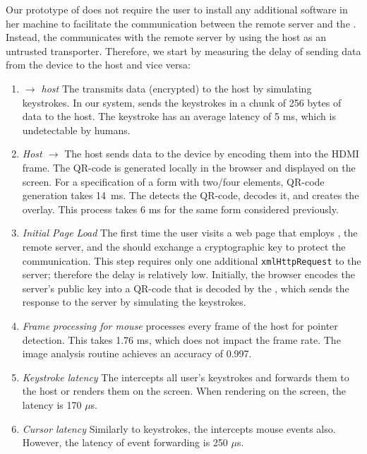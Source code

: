 Our prototype of \name does not require the user to install any additional software in her machine to facilitate the communication between the remote server and the \device. Instead, the \device communicates with the remote server by using the host as an untrusted transporter. Therefore, we start by measuring the delay of sending data from the device to the host and vice versa:

\begin{enumerate}
  \item \emph{\device $\rightarrow$ host} The \device transmits data (encrypted) to the host by simulating keystrokes. In our system, \device sends the keystrokes in a chunk of 256 bytes of data to the host. The keystroke has an average latency of 5 ms, which is undetectable by humans.  


\item \emph{Host $\rightarrow$ \device} The host sends data to the device by encoding them into the HDMI frame. The QR-code is generated locally in the browser and displayed on the screen. For a specification of a form with two/four elements, QR-code generation takes 14\ ms. The \device detects the QR-code, decodes it, and creates the overlay. This process takes 6 ms for the same form considered previously.
 
 \item \emph{Initial Page Load} The first time the user visits a web page that employs \name, the remote server, and the \device should exchange a cryptographic key to protect the communication. This step requires only one additional \texttt{xmlHttpRequest} to the server; therefore the delay is relatively low. Initially, the browser encodes the server's public key into a QR-code that is decoded by the \device, which sends the response to the server by simulating the keystrokes.


\item \emph{Frame processing for mouse} \device processes every frame of the host for pointer detection. This takes 1.76 ms, which does not impact the frame rate. The image analysis routine achieves an accuracy of 0.997. 


\item \emph{Keystroke latency} The \device intercepts all user's keystrokes and forwards them to the host or renders them on the screen. When rendering on the screen, the latency is 170 $\mu$s.


\item \emph{Cursor latency} Similarly to keystrokes, the \device intercepts mouse events also. However, the latency of event forwarding is 250 $\mu$s.


\end{enumerate}
